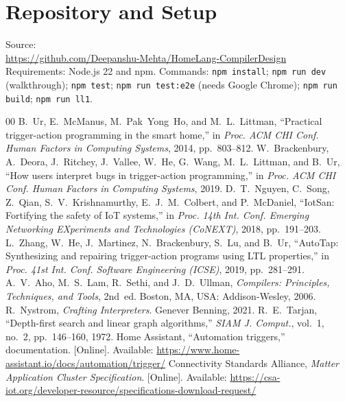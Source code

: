 \documentclass[conference]{IEEEtran}
\newcommand{\code}[1]{\texttt{#1}}
\begin{document}
\section*{Repository and Setup}
Source:\\ \url{https://github.com/Deepanshu-Mehta/HomeLang-CompilerDesign}\\ Requirements: Node.js 22 and npm. Commands: \code{npm install}; \code{npm run dev} (walkthrough); \code{npm test}; \code{npm run test:e2e} (needs Google Chrome); \code{npm run build}; \code{npm run ll1}.

\begin{thebibliography}{00}
 B.~Ur, E.~McManus, M.~Pak~Yong~Ho, and M.~L.~Littman, ``Practical trigger-action programming in the smart home,'' in \textit{Proc. ACM CHI Conf. Human Factors in Computing Systems}, 2014, pp.~803--812.
 W.~Brackenbury, A.~Deora, J.~Ritchey, J.~Vallee, W.~He, G.~Wang, M.~L.~Littman, and B.~Ur, ``How users interpret bugs in trigger-action programming,'' in \textit{Proc. ACM CHI Conf. Human Factors in Computing Systems}, 2019.
 D.~T.~Nguyen, C.~Song, Z.~Qian, S.~V.~Krishnamurthy, E.~J.~M.~Colbert, and P.~McDaniel, ``IotSan: Fortifying the safety of IoT systems,'' in \textit{Proc. 14th Int. Conf. Emerging Networking EXperiments and Technologies (CoNEXT)}, 2018, pp.~191--203.
 L.~Zhang, W.~He, J.~Martinez, N.~Brackenbury, S.~Lu, and B.~Ur, ``AutoTap: Synthesizing and repairing trigger-action programs using LTL properties,'' in \textit{Proc. 41st Int. Conf. Software Engineering (ICSE)}, 2019, pp.~281--291.
 A.~V.~Aho, M.~S.~Lam, R.~Sethi, and J.~D.~Ullman, \textit{Compilers: Principles, Techniques, and Tools}, 2nd~ed. Boston, MA, USA: Addison-Wesley, 2006.
 R.~Nystrom, \textit{Crafting Interpreters}. Genever Benning, 2021.
 R.~E.~Tarjan, ``Depth-first search and linear graph algorithms,'' \textit{SIAM J. Comput.}, vol.~1, no.~2, pp.~146--160, 1972.
 Home Assistant, ``Automation triggers,'' documentation. [Online]. Available: \url{https://www.home-assistant.io/docs/automation/trigger/}
 Connectivity Standards Alliance, \textit{Matter Application Cluster Specification}. [Online]. Available: \url{https://csa-iot.org/developer-resource/specifications-download-request/}
\end{thebibliography}
\end{document}
